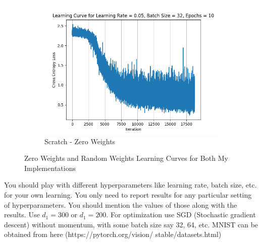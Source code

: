 \documentclass[a4paper]{article}
\theoremstyle{definition}
\newenvironment{soln}{
    \leavevmode\color{blue}\ignorespaces
}{}
\begin{document}
\begin{enumerate}
\begin{soln}
\begin{figure}[H]
\begin{subfigure}{0.5\textwidth}
              \includegraphics[width=1.1\linewidth]{MNIST_Learning_Curve_Self_Zero.png}
              \caption{Scratch - Zero Weights}
              \label{fig:3sub4}
              \end{subfigure}
            \caption{Zero Weights and Random Weights Learning Curves for Both My Implementations}
            \label{fig:3}
        \end{figure}
    \end{soln}
\end{enumerate}

You should play with different hyperparameters like learning rate, batch size, etc. for your own learning. You only need to report results for any particular setting of hyperparameters. You should mention the values of those along with the results. Use $d_1 = 300$ or $d_1 = 200$. For optimization use SGD (Stochastic gradient descent) without momentum, with some batch size say 32, 64, etc. MNIST can be obtained from here (https://pytorch.org/vision/ stable/datasets.html)


\end{document}
